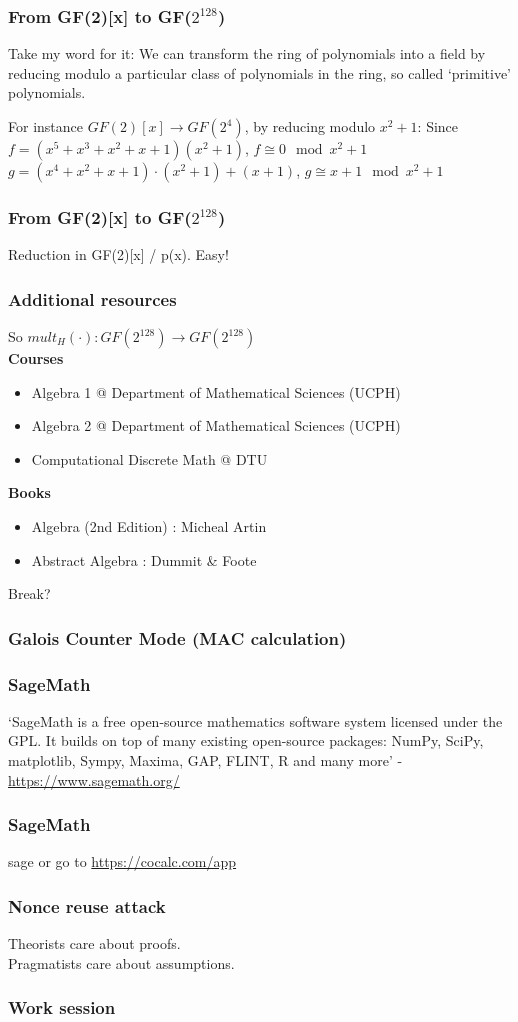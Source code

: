 \documentclass{beamer}
\begin{document}
\begin{frame}
\frametitle{From GF(2)[x] to GF($2^{128}$)}

Take my word for it:
We can transform the ring of polynomials into a field by reducing
modulo a particular class of polynomials in the ring, so called `primitive' polynomials.

\vspace{3mm}

For instance $GF(2)[x] \to GF(2^{4})$, by reducing modulo $x^{2} + 1$:
Since $ f = (x^{5} + x^{3} + x^{2} + x + 1) (x^{2} + 1)$, $f \cong 0 \mod x^{2} + 1$
$ g = (x^{4} + x^{2} + x + 1) \cdot (x^{2} + 1) + (x + 1)$, $g \cong x + 1 \mod x^{2} + 1$

\end{frame}

\begin{frame}
\frametitle{From GF(2)[x] to GF($2^{128}$)}
Reduction in GF(2)[x] / p(x). Easy!
\end{frame}

\begin{frame}
\frametitle{Additional resources}
So $mult_{H}(\cdot) : GF(2^{128}) \to GF(2^{128})$ \\
\vspace{3mm}
\textbf{Courses}
\begin{itemize}
    \item Algebra 1 @ Department of Mathematical Sciences (UCPH)
    \item Algebra 2 @ Department of Mathematical Sciences (UCPH)
    \item Computational Discrete Math @ DTU
\end{itemize}
\textbf{Books}
\begin{itemize}
    \item Algebra (2nd Edition) : Micheal Artin
    \item Abstract Algebra : Dummit \& Foote
\end{itemize}
Break?
\end{frame}

\begin{frame}
\frametitle{Galois Counter Mode (MAC calculation)}
\end{frame}

\begin{frame}
\frametitle{SageMath}
`SageMath is a free open-source mathematics software system licensed under the GPL.
 It builds on top of many existing open-source packages:
 NumPy, SciPy, matplotlib, Sympy, Maxima, GAP, FLINT, R and many more'
 - \url{https://www.sagemath.org/}
\end{frame}

\begin{frame}
\frametitle{SageMath}
sage or go to \url{https://cocalc.com/app}
\end{frame}


\begin{frame}
\frametitle{Nonce reuse attack}
Theorists care about proofs. \\
Pragmatists care about assumptions.
\end{frame}

\begin{frame}
\frametitle{Work session}
\end{frame}
\end{document}
